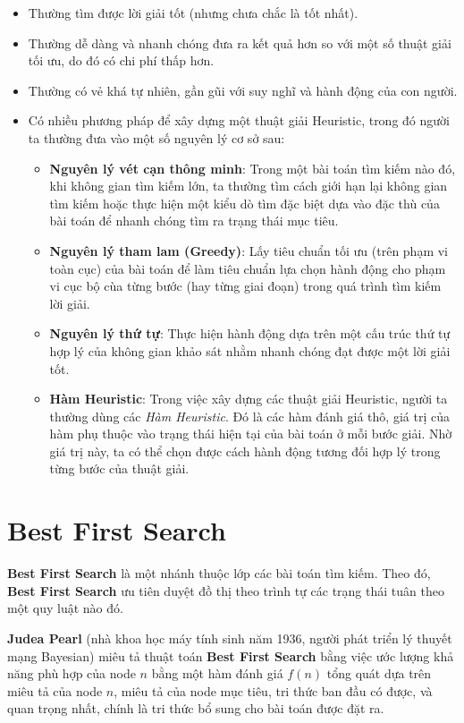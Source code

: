 \documentclass[a4paper, 11pt]{article}
\begin{document}
\begin{itemize}
  \item Thường tìm được lời giải tốt (nhưng chưa chắc là tốt nhất).
  \item Thường dễ dàng và nhanh chóng đưa ra kết quả hơn so với một số thuật giải tối ưu, do đó có chi phí thấp hơn.
  \item Thường có vẻ khá tự nhiên, gần gũi với suy nghĩ và hành động của con người.
  \item Có nhiều phương pháp để xây dựng một thuật giải Heuristic, trong đó người ta thường đưa vào một số nguyên lý cơ sở sau:
  \begin{itemize}
    \item \textbf{Nguyên lý vét cạn thông minh}: Trong một bài toán tìm kiếm nào đó, khi không gian tìm kiếm lớn, ta thường tìm cách giới hạn lại không gian tìm kiếm hoặc thực hiện một kiểu dò tìm đặc biệt dựa vào đặc thù của bài toán để nhanh chóng tìm ra trạng thái mục tiêu.
    \item \textbf{Nguyên lý tham lam (Greedy)}: Lấy tiêu chuẩn tối ưu (trên phạm vi toàn cục) của bài toán để làm tiêu chuẩn lựa chọn hành động cho phạm vi cục bộ cùa từng bước (hay từng giai đoạn) trong quá trình tìm kiếm lời giải.
    \item \textbf{Nguyên lý thứ tự}: Thực hiện hành động dựa trên một cấu trúc thứ tự hợp lý của không gian khảo sát nhằm nhanh chóng đạt được một lời giải tốt.
    \item \textbf{Hàm Heuristic}: Trong việc xây dựng các thuật giải Heuristic, người ta thường dùng các \textit{Hàm Heuristic}. Đó là các hàm đánh giá thô, giá trị của hàm phụ thuộc vào trạng thái hiện tại của bài toán ở mỗi bước giải. Nhờ giá trị này, ta có thể chọn được cách hành động tương đối hợp lý trong từng bước của thuật giải.
  \end{itemize}
\end{itemize}

\section{Best First Search}
\textbf{Best First Search} là một nhánh thuộc lớp các bài toán tìm kiếm. Theo đó, \textbf{Best First Search} ưu tiên duyệt đồ thị theo trình tự các trạng thái tuân theo một quy luật nào đó.

\textbf{Judea Pearl} (nhà khoa học máy tính sinh năm 1936, người phát triển lý thuyết mạng Bayesian) miêu tả thuật toán \textbf{Best First Search} bằng việc ước lượng khả năng phù hợp của node $n$ bằng một hàm đánh giá $f(n)$ tổng quát dựa trên miêu tả của node $n$, miêu tả của node mục tiêu, tri thức ban đầu có được, và quan trọng nhất, chính là tri thức bổ sung cho bài toán được đặt ra.
\end{document}
